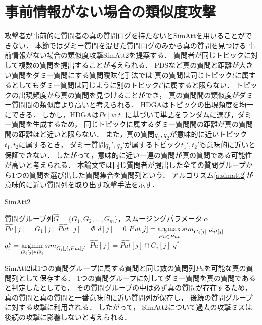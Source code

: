 \documentclass[master]{suribt}
\theoremstyle{definition}
\newcommand{\argmax}{\mathop{\rm argmax}\limits}
\newcommand{\argmin}{\mathop{\rm argmin}\limits}
\begin{document}
 \section{事前情報がない場合の類似度攻撃} \label{s:SimAtt2}
 攻撃者が事前的に質問者の真の質問ログを持たないとSimAttを用いることができない．
 本節ではダミー質問を混ぜた質問ログのみから真の質問を見つける
 事前情報がない場合の類似度攻撃SimAtt2を提案する．
 質問者が同じトピックに対して複数の質問を提出することが考えられる．
 PDSなど真の質問と距離が大きい質問をダミー質問にする質問曖昧化手法では
 真の質問は同じトピック$t$に属するとしてもダミー質問は同じように別のトピック$t'$に属すると限らない．
 トピックの出現頻度から真の質問を見つけることができ，
 真の質問間の類似度がダミー質問間の類似度より高いと考えられる．
 HDGAはトピックの出現頻度を均一にできる．
 しかし，HDGAは$Pr[w|t]$に基づいて単語をランダムに選び，ダミー質問を生成するため，
 同じトピックに属するダミー質問間の距離が真の質問間の距離ほど近いと限らない．
 また，真の質問$q_1,q_2$が意味的に近いトピック$t_1,t_2$に属するとき，
 ダミー質問$q_1',q_2'$が属するトピック$t_1',t_2'$も意味的に近いと保証できない．
 したがって，意味的に近い一連の質問が真の質問である可能性が高いと考えられる．
 本論文では同じ質問者が提出した全ての質問グループから1つの質問を選び出した質問集合を質問列という．
 アルゴリズム\ref{a:simatt2}が意味的に近い質問列を取り出す攻撃手法を示す．

 \begin{algorithm}
 \caption{SimAtt2}
 \begin{algorithmic}[1]
  \Require 質問グループ列$\hat{G}=\{ G_1,G_2, \dots , G_m\}$，スムージングパラメータ:$\alpha$
   \State $\hat{Pu}[j] = G_1[j]$
   \State $\hat{Put}[j] = \Phi$
   \State $d[j] = 0$
  \EndFor
   \State $\hat{Put}[j] = \argmax_{Pu \in \hat{Put}}sim_{G_i[j],\hat{Put}[j]}$
   \EndFor
   \State $q^*_i = \argmin_{G_i[j] \in G_i}sim_{G_i[j],\hat{Put}[j]}$
    \State $\hat{Pu}[j] = \hat{Put}[j] \cap G_i[j]$
   \EndFor
  \EndFor
  \Ensure $q^*$
 \end{algorithmic}
 \label{a:simatt2}
 \end{algorithm}
 
 SimAtt2は1つの質問グループに属する質問と同じ数の質問列$Pu$を可能な真の質問列として保存する．
 1つの質問グループに対してダミー質問を真の質問であると判定したとしても，
 その質問グループの中は必ず真の質問が存在するため，
 真の質問と真の質問と一番意味的に近い質問列が保存し，
 後続の質問グループに対する攻撃に利用される．
 したがって，
 SimAtt2について過去の攻撃ミスは後続の攻撃に影響しないと考えられる．
\end{document}
